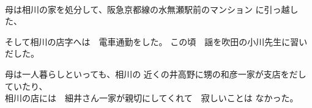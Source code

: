 \\
母は相川の家を処分して、阪急京都線の水無瀬駅前のマンション
に引っ越した、

そして相川の店字へは　電車通勤をした。
この頃　謡を吹田の小川先生に習いだした。

母は一人暮らしといっても、相川の
近くの井高野に甥の和彦一家が支店をだしていたり、\\
相川の店には　細井さん一家が親切にしてくれて　寂しいことは
なかった。

